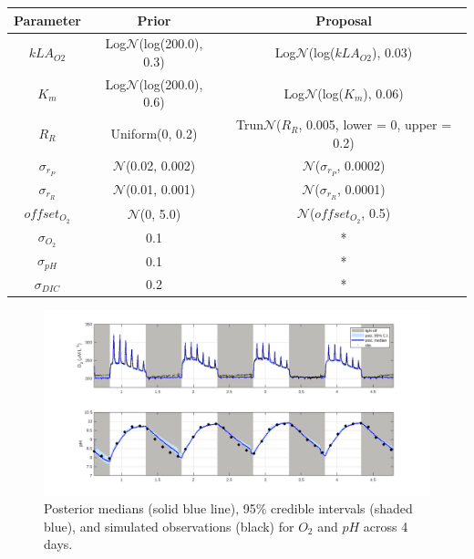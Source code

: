 \documentclass{ruthesis}
\begin{document}
\FloatBarrier
\begin{tabular}{c | c  |  c}
	\hline
	\bfseries{Parameter} & \bfseries{Prior} &  \bfseries{Proposal} \\ \hline
	$kLA_{O2}$  & Log$\mathcal{N}$(log(200.0), 0.3)  & Log$\mathcal{N}$(log($kLA_{O2}$), 0.03) \\
	$K_m$ 		&  Log$\mathcal{N}$(log(200.0), 0.6) & Log$\mathcal{N}$(log($K_m$), 0.06) \\
	$R_R$  		& Uniform(0, 0.2) &  Trun$\mathcal{N}$($R_R$, 0.005, lower = 0, upper = 0.2) \\
	$\sigma_{r_P}$ & $\mathcal{N}$(0.02, 0.002)   & $\mathcal{N}$($\sigma_{r_P}$, 0.0002)   \\
	$\sigma_{r_R}$ & $\mathcal{N}$(0.01, 0.001)   & $\mathcal{N}$($\sigma_{r_R}$, 0.0001)   \\
	$offset_{O_2}$ & $\mathcal{N}$(0, 5.0)     & $\mathcal{N}$($offset_{O_2}$, 0.5)   \\
	$\sigma_{O_2}$ 	& 0.1 	& * \\
	$\sigma_{pH}$ 	& 0.1 	& * \\
	$\sigma_{DIC}$ 	& 0.2 	& * \\	
\end{tabular}

\FloatBarrier



\begin{figure}
	\centerline{\includegraphics[width=1.2\textwidth]{images_microalgae/plots_chris_offset_sigma/O2_pH}}
	\caption[.]{Posterior medians (solid blue line), 95\% credible intervals (shaded blue), and simulated observations (black) for $O_2$ and $pH$ across 4 days.}
	\label{fig:micro_exp_offset_sigma_O2_pH}
\end{figure}
\end{document}
